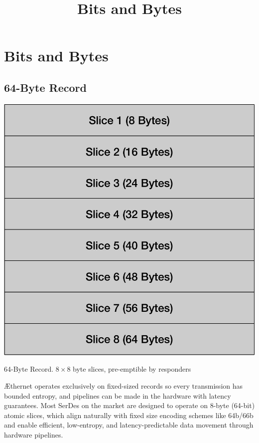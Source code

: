 \documentclass[../OAE-SPEC-MAIN.tex]{subfiles}
\title{Bits and Bytes}
\begin{document}
\chapter{Bits and Bytes}\label{sec:bits-and-bytes}


\section{64-Byte Record}
\begin{marginfigure}[+20mm]
  \includegraphics[width=\linewidth]{./figures/64-Byte-record.pdf}
  \caption{64-Byte Record. $8\times8$ byte slices, pre-emptible by responders} %
\end{marginfigure}



\AE thernet operates exclusively on fixed-sized records so every transmission has bounded entropy, and pipelines can be made in the hardware with latency guarantees. Most SerDes on the market are designed to operate on 8-byte (64-bit) atomic slices, which align naturally with fixed size encoding schemes like 64b/66b and enable efficient, low-entropy, and latency-predictable data movement through hardware pipelines.
\end{document}
